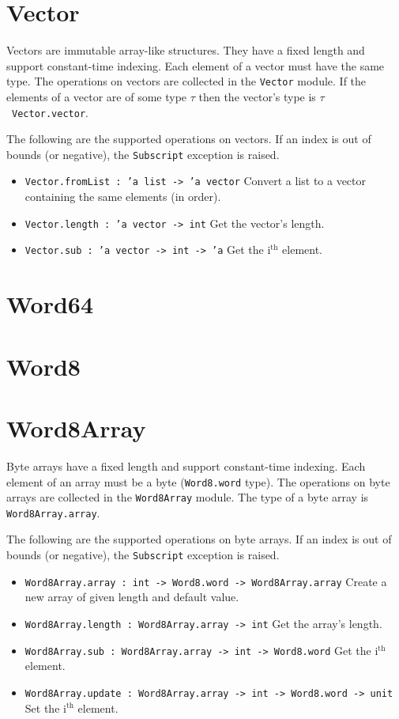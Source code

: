 \documentclass[12pt,a4paper]{book}
\begin{document}
\section{Vector}
\label{sect:vector}

Vectors are immutable array-like structures. They have a fixed length and support constant-time indexing. Each element of a vector must have the same type. The operations on vectors are collected in the \texttt{Vector} module. If the elements of a vector are of some type $\tau$ then the vector's type is $\tau$\ \texttt{Vector.vector}.

The following are the supported operations on vectors. If an index is out of bounds (or negative), the \texttt{Subscript} exception is raised.
\begin{itemize}
\item \texttt{Vector.fromList : 'a list -> 'a vector} Convert a list to a vector containing the same elements (in order).
\item \texttt{Vector.length : 'a vector -> int} Get the vector's length.
\item \texttt{Vector.sub : 'a vector -> int -> 'a} Get the i$^\textrm{th}$ element.
\end{itemize}

\section{Word64}
\label{sect:word64}

\section{Word8}
\label{sect:word8}

\section{Word8Array}
Byte arrays have a fixed length and support constant-time indexing. Each element of an array must be a byte (\texttt{Word8.word} type). The operations on byte arrays are collected in the \texttt{Word8Array} module. The type of a byte array is \texttt{Word8Array.array}.

The following are the supported operations on byte arrays. If an index is out of bounds (or negative), the \texttt{Subscript} exception is raised.
\begin{itemize}
\item \texttt{Word8Array.array : int -> Word8.word -> Word8Array.array} Create a new array of given length and default value.
\item \texttt{Word8Array.length : Word8Array.array -> int} Get the array's length.
\item \texttt{Word8Array.sub : Word8Array.array -> int -> Word8.word} Get the i$^\textrm{th}$ element.
\item \texttt{Word8Array.update : Word8Array.array -> int -> Word8.word -> unit} Set the i$^\textrm{th}$ element.
\end{itemize}
\end{document}
